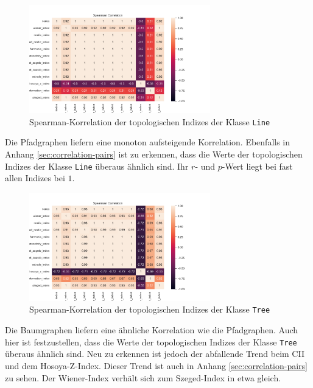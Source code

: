 \begin{figure}[H]
    \centering
    \includegraphics[width=0.7\textwidth]{images/30_results/line-correlation.png}
    \caption{Spearman-Korrelation der topologischen Indizes der Klasse \texttt{Line}}
    \label{fig:correlation-line}
\end{figure}

Die Pfadgraphen liefern eine monoton aufsteigende Korrelation. Ebenfalls in Anhang \ref{sec:correlation-pairs} ist zu erkennen, dass die Werte der topologischen Indizes der Klasse \texttt{Line} überaus ähnlich sind. Ihr $r$- und $p$-Wert liegt bei fast allen Indizes bei $1$.

\begin{figure}[H]
    \centering
    \includegraphics[width=0.7\textwidth]{images/30_results/tree-correlation.png}
    \caption{Spearman-Korrelation der topologischen Indizes der Klasse \texttt{Tree}}
    \label{fig:correlation-tree}
\end{figure}

Die Baumgraphen liefern eine ähnliche Korrelation wie die Pfadgraphen. Auch hier ist festzustellen, dass die Werte der topologischen Indizes der Klasse \texttt{Tree} überaus ähnlich sind. Neu zu erkennen ist jedoch der abfallende Trend beim CII und dem Hosoya-Z-Index. Dieser Trend ist auch in Anhang \ref{sec:correlation-pairs} zu sehen. Der Wiener-Index verhält sich zum Szeged-Index in etwa gleich.

